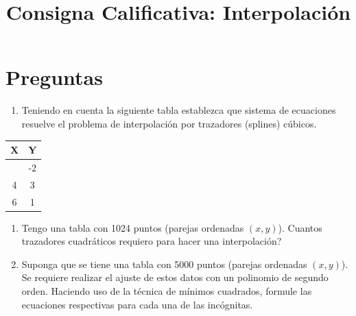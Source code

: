 \documentclass[
  letterpaper,
  DIV=11,
  numbers=noendperiod]{scrartcl}
\title{Consigna Calificativa: Interpolación}
\author{}
\date{}
\providecommand{\tightlist}{%
  \setlength{\itemsep}{0pt}\setlength{\parskip}{0pt}}\usepackage{longtable,booktabs,array}
\begin{document}
\maketitle

\section{Preguntas}\label{preguntas}

\begin{enumerate}
\def\labelenumi{\arabic{enumi}.}
\tightlist
\item
  Teniendo en cuenta la siguiente tabla establezca que sistema de
  ecuaciones resuelve el problema de interpolación por trazadores
  (splines) cúbicos.
\end{enumerate}

\begin{longtable}[]{@{}cc@{}}
\toprule\noalign{}
\textbf{X} & \textbf{Y} \\
\midrule\noalign{}
\endhead
\bottomrule\noalign{}
\endlastfoot
1 & -2 \\
4 & 3 \\
6 & 1 \\
\end{longtable}

\begin{enumerate}
\def\labelenumi{\arabic{enumi}.}
\setcounter{enumi}{1}
\tightlist
\item
  Tengo una tabla con 1024 puntos (parejas ordenadas
  \(\left(x,y\right)\)). Cuantos trazadores cuadráticos requiero para
  hacer una interpolación?
\item
  Suponga que se tiene una tabla con 5000 puntos (parejas ordenadas
  \(\left(x,y\right)\)). Se requiere realizar el ajuste de estos datos
  con un polinomio de segundo orden. Haciendo uso de la técnica de
  mínimos cuadrados, formule las ecuaciones respectivas para cada una de
  las incógnitas.
\end{enumerate}
\end{document}
